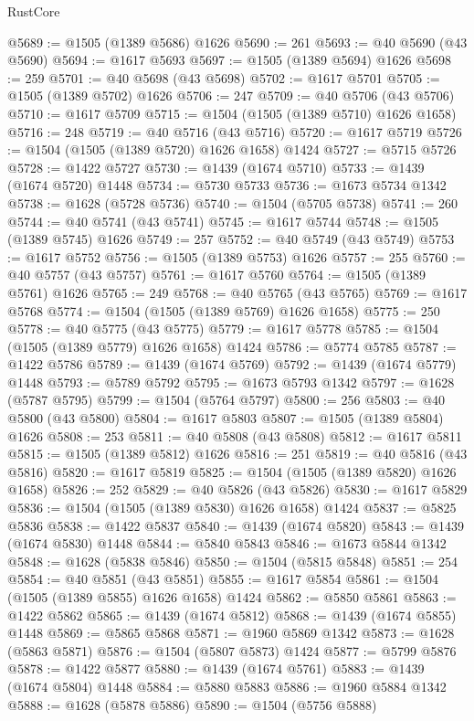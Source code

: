 \begin{lexlean}{RustCore}
\begin{coremodule}
@5689 := @1505 (@1389 @5686) @1626
@5690 := 261
@5693 := @40 @5690 (@43 @5690)
@5694 := @1617 @5693
@5697 := @1505 (@1389 @5694) @1626
@5698 := 259
@5701 := @40 @5698 (@43 @5698)
@5702 := @1617 @5701
@5705 := @1505 (@1389 @5702) @1626
@5706 := 247
@5709 := @40 @5706 (@43 @5706)
@5710 := @1617 @5709
@5715 := @1504 (@1505 (@1389 @5710) @1626 @1658)
@5716 := 248
@5719 := @40 @5716 (@43 @5716)
@5720 := @1617 @5719
@5726 := @1504 (@1505 (@1389 @5720) @1626 @1658) @1424
@5727 := @5715 @5726
@5728 := @1422 @5727
@5730 := @1439 (@1674 @5710)
@5733 := @1439 (@1674 @5720) @1448
@5734 := @5730 @5733
@5736 := @1673 @5734 @1342
@5738 := @1628 (@5728 @5736)
@5740 := @1504 (@5705 @5738)
@5741 := 260
@5744 := @40 @5741 (@43 @5741)
@5745 := @1617 @5744
@5748 := @1505 (@1389 @5745) @1626
@5749 := 257
@5752 := @40 @5749 (@43 @5749)
@5753 := @1617 @5752
@5756 := @1505 (@1389 @5753) @1626
@5757 := 255
@5760 := @40 @5757 (@43 @5757)
@5761 := @1617 @5760
@5764 := @1505 (@1389 @5761) @1626
@5765 := 249
@5768 := @40 @5765 (@43 @5765)
@5769 := @1617 @5768
@5774 := @1504 (@1505 (@1389 @5769) @1626 @1658)
@5775 := 250
@5778 := @40 @5775 (@43 @5775)
@5779 := @1617 @5778
@5785 := @1504 (@1505 (@1389 @5779) @1626 @1658) @1424
@5786 := @5774 @5785
@5787 := @1422 @5786
@5789 := @1439 (@1674 @5769)
@5792 := @1439 (@1674 @5779) @1448
@5793 := @5789 @5792
@5795 := @1673 @5793 @1342
@5797 := @1628 (@5787 @5795)
@5799 := @1504 (@5764 @5797)
@5800 := 256
@5803 := @40 @5800 (@43 @5800)
@5804 := @1617 @5803
@5807 := @1505 (@1389 @5804) @1626
@5808 := 253
@5811 := @40 @5808 (@43 @5808)
@5812 := @1617 @5811
@5815 := @1505 (@1389 @5812) @1626
@5816 := 251
@5819 := @40 @5816 (@43 @5816)
@5820 := @1617 @5819
@5825 := @1504 (@1505 (@1389 @5820) @1626 @1658)
@5826 := 252
@5829 := @40 @5826 (@43 @5826)
@5830 := @1617 @5829
@5836 := @1504 (@1505 (@1389 @5830) @1626 @1658) @1424
@5837 := @5825 @5836
@5838 := @1422 @5837
@5840 := @1439 (@1674 @5820)
@5843 := @1439 (@1674 @5830) @1448
@5844 := @5840 @5843
@5846 := @1673 @5844 @1342
@5848 := @1628 (@5838 @5846)
@5850 := @1504 (@5815 @5848)
@5851 := 254
@5854 := @40 @5851 (@43 @5851)
@5855 := @1617 @5854
@5861 := @1504 (@1505 (@1389 @5855) @1626 @1658) @1424
@5862 := @5850 @5861
@5863 := @1422 @5862
@5865 := @1439 (@1674 @5812)
@5868 := @1439 (@1674 @5855) @1448
@5869 := @5865 @5868
@5871 := @1960 @5869 @1342
@5873 := @1628 (@5863 @5871)
@5876 := @1504 (@5807 @5873) @1424
@5877 := @5799 @5876
@5878 := @1422 @5877
@5880 := @1439 (@1674 @5761)
@5883 := @1439 (@1674 @5804) @1448
@5884 := @5880 @5883
@5886 := @1960 @5884 @1342
@5888 := @1628 (@5878 @5886)
@5890 := @1504 (@5756 @5888)

\end{coremodule}
\end{lexlean}
